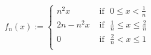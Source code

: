 \documentclass[preview]{standalone}
\begin{document}
\begin{align*}
f_{n}(x) := \begin{cases}n^{2}x  &  \text{ if} \ \ \ 0 \leq x < \frac{1}{n} \\2n-n^{2}x &  \text{ if} \ \ \ \frac{1}{n} \leq x \leq \frac{2}{n} \\0 &  \text{ if} \ \ \ \frac{2}{n} < x \leq 1 \\\end{cases}
\end{align*}
\end{document}
